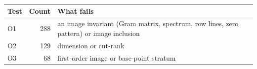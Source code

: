 \begin{tabular}{@{}lrl@{}}\toprule\headrow\textbf{Test} & \textbf{Count} & \textbf{What fails}\\\midrule
O1 & 288 & an image invariant (Gram matrix, spectrum, row lines, zero pattern) or image inclusion\\
O2 & 129 & dimension or cut-rank\\
O3 & 68 & first-order image or base-point stratum\\
\bottomrule\end{tabular}
